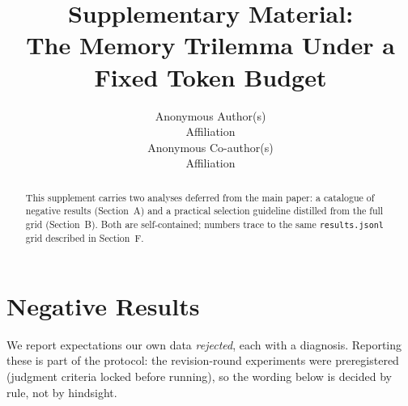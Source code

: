 \documentclass{article} %
\title{Supplementary Material:\\ The Memory Trilemma Under a Fixed Token Budget}
\author{Anonymous Author(s) \\
Affiliation \\
\And
Anonymous Co-author(s) \\
Affiliation}
\begin{document}
\maketitle
\begin{abstract}
This supplement carries two analyses deferred from the main paper: a catalogue of
negative results (Section~A) and a practical selection guideline distilled from the
full grid (Section~B). Both are self-contained; numbers trace to the same
\texttt{results.jsonl} grid described in Section~F.
\end{abstract}
\section{Negative Results}
\label{sec:negative}
We report expectations our own data \emph{rejected}, each with a diagnosis. Reporting these
is part of the protocol: the revision-round experiments were preregistered (judgment criteria
locked before running), so the wording below is decided by rule, not by hindsight.
\end{document}
